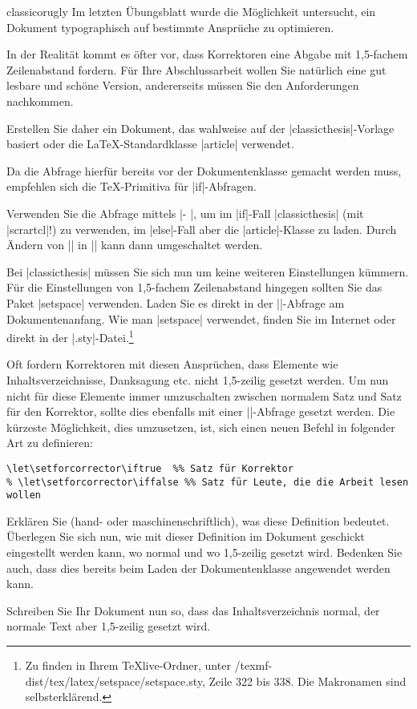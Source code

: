 \documentclass[
	draft,
	blatt=12,
	ausgabe=02.\,07.\,2010,
	rückgabe=09.\,07.\,2010
]{lcourse-hd}
\begin{document}
\begin{exercise}[
  name=Typographie auf Anfrage – Teil 2,
  punkte=6,
  abgabe = Quelltext per Mail und ausgedruckt. Erklärungen zum Codebeispiel hand- oder maschinenschriftlich. Fertiges Dokument (in der |classicthesis|-Version) als pdf per Mail.
]{classicorugly}
Im letzten Übungsblatt wurde die Möglichkeit untersucht, ein Dokument typographisch auf bestimmte Ansprüche zu optimieren.

In der Realität kommt es öfter vor, dass Korrektoren eine Abgabe mit 1,5-fachem Zeilenabstand fordern. Für Ihre Abschlussarbeit wollen Sie natürlich eine gut lesbare und schöne Version, andererseits müssen Sie den Anforderungen nachkommen.

Erstellen Sie daher ein Dokument, das wahlweise auf der |classicthesis|-Vorlage basiert oder die \LaTeX-Standardklasse |article| verwendet.

Da die Abfrage hierfür bereits vor der Dokumentenklasse gemacht werden muss, empfehlen sich die \TeX-Primitiva für |if|-Abfragen.

Verwenden Sie die Abfrage mittels |\iftrue - \else - \fi|, um im |if|-Fall |classicthesis| (mit |scrartcl|!) zu verwenden, im |else|-Fall aber die |article|-Klasse zu laden. Durch Ändern von |\iftrue| in |\iffalse| kann dann umgeschaltet werden.

Bei |classicthesis| müssen Sie sich nun um keine weiteren Einstellungen kümmern. Für die Einstellungen von 1,5-fachem Zeilenabstand hingegen sollten Sie das Paket |setspace| verwenden.  Laden Sie es direkt in der |\iftrue|-Abfrage am Dokumentenanfang. Wie man |setspace| verwendet, finden Sie im Internet oder direkt in der |.sty|-Datei.\footnote{Zu finden in Ihrem \TeX live-Ordner, unter /texmf-dist/tex/latex/setspace/setspace.sty, Zeile 322 bis 338. Die Makronamen sind selbsterklärend.}

Oft fordern Korrektoren mit diesen Ansprüchen, dass Elemente wie Inhaltsverzeichnisse, Danksagung etc. nicht 1,5-zeilig gesetzt werden. Um nun nicht  für diese Elemente immer umzuschalten zwischen normalem Satz und Satz für den Korrektor, sollte dies ebenfalls mit einer |\if|-Abfrage gesetzt werden. Die kürzeste Möglichkeit, dies umzusetzen, ist, sich einen neuen Befehl in folgender Art zu definieren:
\begin{verbatim}
\let\setforcorrector\iftrue  %% Satz für Korrektor
% \let\setforcorrector\iffalse %% Satz für Leute, die die Arbeit lesen wollen
\end{verbatim}
Erklären Sie (hand- oder maschinenschriftlich), was diese Definition bedeutet. Überlegen Sie sich nun, wie mit dieser Definition im Dokument geschickt eingestellt werden kann, wo normal und wo 1,5-zeilig gesetzt wird. Bedenken Sie auch, dass dies bereits beim Laden der Dokumentenklasse angewendet werden kann.

Schreiben Sie Ihr Dokument nun so, dass das Inhaltsverzeichnis normal, der normale Text aber 1,5-zeilig gesetzt wird.
\end{exercise}
\end{document}
